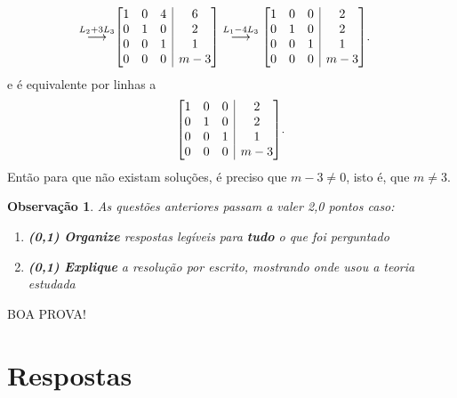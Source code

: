 \documentclass[12pt,a4paper]{article}
\makeatletter
\newtheorem*{note}{Observação}
\newenvironment{amatrix}[1]{%
  \left[\begin{array}{@{}*{#1}{c}|c@{}}
}{%
  \end{array}\right]
}
\newcommand{\grstep}[2][\relax]{%
   \ensuremath{\mathrel{
       {\mathop{\longrightarrow}\limits^{#2\mathstrut}_{
                                     \begin{subarray}{l} #1 \end{subarray}}}}}}
\makeatother
\begin{document}
\begin{ExerciseList}
\begin{align*}
\grstep{ L_2 +3 L_3 }
&
\begin{amatrix}{3}
1 & 0 & 4 &  6 \\
0 & 1 & 0 &  2 \\
0 & 0 & 1 &  1 \\
0 & 0 & 0 &  m-3
\end{amatrix}
\grstep{ L_1 -4 L_3 }
\begin{amatrix}{3}
1 & 0 & 0 &  2 \\
0 & 1 & 0 &  2 \\
0 & 0 & 1 &  1 \\
0 & 0 & 0 &  m-3
\end{amatrix}.
\end{align*}
e é equivalente por linhas a
\[
\begin{amatrix}{3}
1 & 0 & 0 & 2 \\
0 & 1 & 0 & 2 \\
0 & 0 & 1 & 1 \\
0 & 0 & 0 & m-3
\end{amatrix}.
\]
Então para que não existam soluções, é preciso que $m-3 \neq 0$, isto é, que $m \neq 3$.
\end{ExerciseList}

\medskip
\begin{note}
As questões anteriores passam a valer 2,0 pontos caso:
\begin{enumerate}
\item \textbf{(0,1) Organize} respostas legíveis para \textbf{tudo} o que foi perguntado
\item \textbf{(0,1) Explique} a resolução por escrito, mostrando onde usou a teoria estudada
\end{enumerate}
\end{note}

\begin{center}
BOA PROVA!
\end{center}

\newpage
\restoregeometry
\section*{Respostas}
\shipoutAnswer
\end{document}
